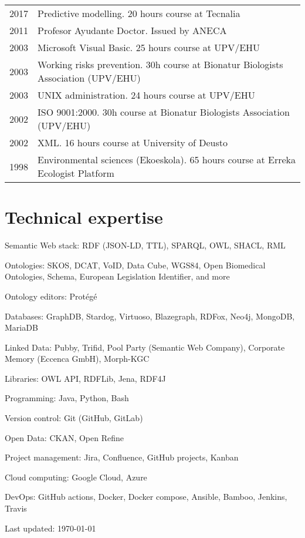 \documentclass[11pt,fullpage]{article}
\renewenvironment{itemize}{
  \begin{list}{}{
    \setlength{\leftmargin}{1.5em}
  }
}{
  \end{list}
}
\begin{document}
\begin{longtable}{p{0.5in}|p{5.5in}}
  2017 & Predictive modelling. 20 hours course at Tecnalia \\
  2011 & Profesor Ayudante Doctor. Issued by ANECA \\
  2003 & Microsoft Visual Basic. 25 hours course at UPV/EHU \\
  2003 & Working risks prevention. 30h course at Bionatur Biologists Association (UPV/EHU) \\
  2003 & UNIX administration. 24 hours course at UPV/EHU \\
  2002 & ISO 9001:2000. 30h course at Bionatur Biologists Association (UPV/EHU) \\
  2002 & XML. 16 hours course at University of Deusto \\
  1998 & Environmental sciences (Ekoeskola). 65 hours course at Erreka Ecologist Platform \\
  
\end{longtable}

\section*{Technical expertise}

\begin{itemize}
  \item Semantic Web stack: RDF (JSON-LD, TTL), SPARQL, OWL, SHACL, RML
  \item Ontologies: SKOS, DCAT, VoID, Data Cube, WGS84, Open Biomedical Ontologies, Schema, European Legislation Identifier, and more
  \item Ontology editors: Prot\'eg\'e 
  \item Databases: GraphDB, Stardog, Virtuoso, Blazegraph, RDFox, Neo4j, 
  MongoDB,
  MariaDB
  \item Linked Data: Pubby, Trifid, Pool Party (Semantic Web Company), Corporate Memory (Eccenca GmbH), Morph-KGC
  \item Libraries: OWL API, RDFLib, Jena, RDF4J
  \item Programming: Java, Python, Bash
  \item Version control: Git (GitHub, GitLab)
  \item Open Data: CKAN, Open Refine
  \item Project management: Jira, Confluence, GitHub projects, Kanban
  \item Cloud computing: Google Cloud, Azure %
  \item DevOps: GitHub actions, Docker, Docker compose, Ansible, Bamboo, Jenkins, Travis
\end{itemize}

\bigskip
\begin{center}
  \begin{footnotesize}
    Last updated: \today
  \end{footnotesize}
\end{center}

\end{document}
